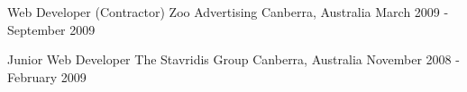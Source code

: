 \begin{cventries}
\vspace{-4.0mm}


\cventry
{Web Developer (Contractor)} %
{Zoo Advertising} %
{Canberra, Australia} %
{March 2009 - September 2009} %
{ %
\begin{cvitems}
\end{cvitems}
}

\vspace{-4.0mm}


\cventry
{Junior Web Developer} %
{The Stavridis Group} %
{Canberra, Australia} %
{November 2008 - February 2009} %
{ %
\begin{cvitems}
\end{cvitems}
}


\end{cventries}